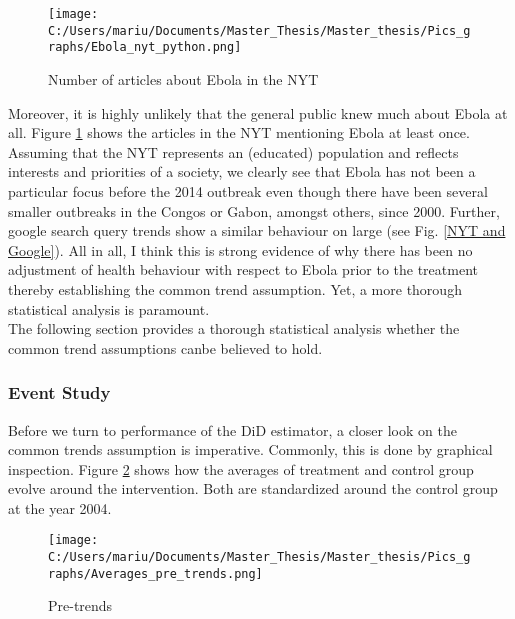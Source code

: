 \documentclass{article}
\begin{document}
\begin{figure}[!ht]
\begin{center}\caption{ Number of articles about Ebola in the NYT \label{Number of articles about Ebola in the NYT}}
\texttt{[image: C:/Users/mariu/Documents/Master\_Thesis/Master\_thesis/Pics\_graphs/Ebola\_nyt\_python.png]}\\
\end{center}
\end{figure}

Moreover, it is highly unlikely that the general public knew much about Ebola at all. Figure \ref{Number of articles about Ebola in the NYT} shows the articles in the NYT mentioning Ebola at least once. Assuming that the NYT represents an (educated) population and reflects interests and priorities of a society, we clearly see that Ebola has not been a particular focus before the 2014 outbreak even though there have been several smaller outbreaks in the Congos or Gabon, amongst others, since 2000. Further, google search query trends show a similar behaviour on large (see Fig. \ref{NYT and Google}). All in all, I think this is strong evidence of why there has been no adjustment of health behaviour with respect to Ebola prior to the treatment thereby establishing the common trend assumption. Yet, a more thorough statistical analysis is paramount. \\
The following section provides a thorough statistical analysis whether the common trend assumptions canbe believed to hold.

\subsubsection{Event Study}

Before we turn to performance of the DiD estimator, a closer look on the common trends assumption is imperative. Commonly, this is done by graphical inspection. Figure \ref{Pre-trends} shows how the averages of treatment and control group evolve around the intervention. Both are standardized around the control group at the year 2004.

\begin{figure}[!ht]
\begin{center}\caption{Pre-trends \label{Pre-trends}}
\texttt{[image: C:/Users/mariu/Documents/Master\_Thesis/Master\_thesis/Pics\_graphs/Averages\_pre\_trends.png]}\\
\end{center}
\end{figure}
\end{document}
